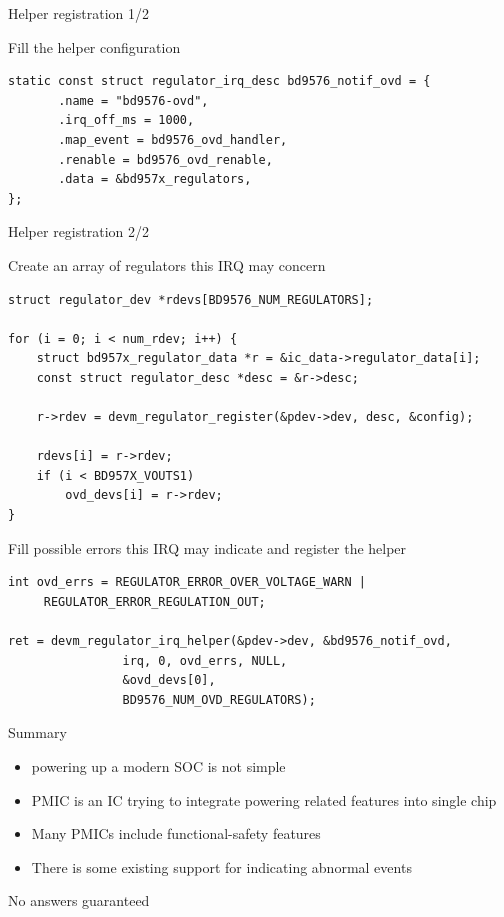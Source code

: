 \documentclass[10pt]{beamer}
\begin{document}

\begin{frame}[fragile]{Helper registration 1/2}
\lstset{language=C}
\scriptsize

Fill the helper configuration
\pause
\begin{lstlisting}
static const struct regulator_irq_desc bd9576_notif_ovd = {              
       .name = "bd9576-ovd",                                            
       .irq_off_ms = 1000,                                              
       .map_event = bd9576_ovd_handler,                                 
       .renable = bd9576_ovd_renable,                                   
       .data = &bd957x_regulators,                                      
}; 
\end{lstlisting}
\end{frame}

\begin{frame}[fragile]{Helper registration 2/2}
\lstset{language=C}
\scriptsize

Create an array of regulators this IRQ may concern
\pause
\begin{lstlisting}
struct regulator_dev *rdevs[BD9576_NUM_REGULATORS];

for (i = 0; i < num_rdev; i++) {
	struct bd957x_regulator_data *r = &ic_data->regulator_data[i];
	const struct regulator_desc *desc = &r->desc;

	r->rdev = devm_regulator_register(&pdev->dev, desc, &config);

	rdevs[i] = r->rdev;
	if (i < BD957X_VOUTS1)
		ovd_devs[i] = r->rdev;
}
\end{lstlisting}
\pause
Fill possible errors this IRQ may indicate and register the helper
\pause
\begin{lstlisting}
int ovd_errs = REGULATOR_ERROR_OVER_VOLTAGE_WARN |
	 REGULATOR_ERROR_REGULATION_OUT;

ret = devm_regulator_irq_helper(&pdev->dev, &bd9576_notif_ovd,
				irq, 0, ovd_errs, NULL,
				&ovd_devs[0],
				BD9576_NUM_OVD_REGULATORS);

\end{lstlisting}
\end{frame}

\begin{frame}{Summary}
\begin{itemize}
	\item powering up a modern SOC is not simple
	\item PMIC is an IC trying to integrate powering related features into single chip
	\item Many PMICs include functional-safety features
	\item There is some existing support for indicating abnormal events
\end{itemize}
\end{frame}

\begin{frame}{No answers guaranteed}
\center
{}
\end{frame}
\end{document}
